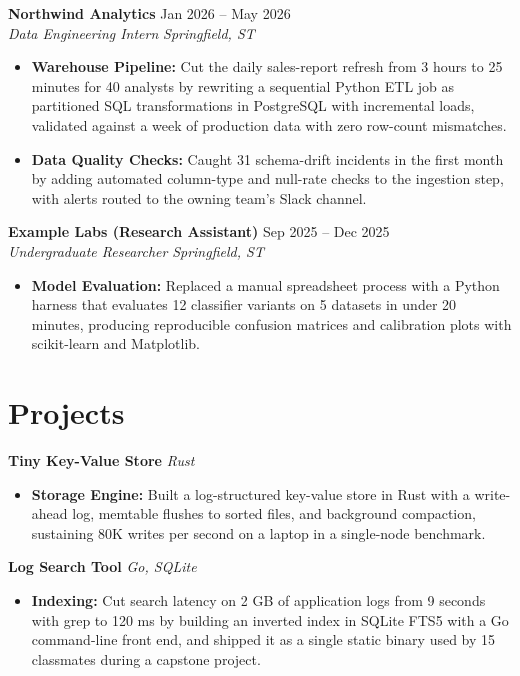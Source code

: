 \documentclass[10pt,letterpaper]{article}
\begin{document}
\textbf{Northwind Analytics} \hfill Jan 2026 -- May 2026 \\[-2pt]
\textit{Data Engineering Intern} \hfill \textit{Springfield, ST}
\begin{itemize}[noitemsep,topsep=2pt]
    \item \textbf{Warehouse Pipeline:} Cut the daily sales-report refresh from 3 hours to 25 minutes for 40 analysts by rewriting a sequential Python ETL job as partitioned SQL transformations in PostgreSQL with incremental loads, validated against a week of production data with zero row-count mismatches.
    \item \textbf{Data Quality Checks:} Caught 31 schema-drift incidents in the first month by adding automated column-type and null-rate checks to the ingestion step, with alerts routed to the owning team's Slack channel.
\end{itemize}

\textbf{Example Labs (Research Assistant)} \hfill Sep 2025 -- Dec 2025 \\[-2pt]
\textit{Undergraduate Researcher} \hfill \textit{Springfield, ST}
\begin{itemize}[noitemsep,topsep=2pt]
    \item \textbf{Model Evaluation:} Replaced a manual spreadsheet process with a Python harness that evaluates 12 classifier variants on 5 datasets in under 20 minutes, producing reproducible confusion matrices and calibration plots with scikit-learn and Matplotlib.
\end{itemize}

\section*{Projects}
\textbf{Tiny Key-Value Store} \hfill \textit{Rust} \\[-2pt]
\begin{itemize}[noitemsep,topsep=2pt]
    \item \textbf{Storage Engine:} Built a log-structured key-value store in Rust with a write-ahead log, memtable flushes to sorted files, and background compaction, sustaining 80K writes per second on a laptop in a single-node benchmark.
\end{itemize}

\textbf{Log Search Tool} \hfill \textit{Go, SQLite} \\[-2pt]
\begin{itemize}[noitemsep,topsep=2pt]
    \item \textbf{Indexing:} Cut search latency on 2 GB of application logs from 9 seconds with grep to 120 ms by building an inverted index in SQLite FTS5 with a Go command-line front end, and shipped it as a single static binary used by 15 classmates during a capstone project.
\end{itemize}
\end{document}
